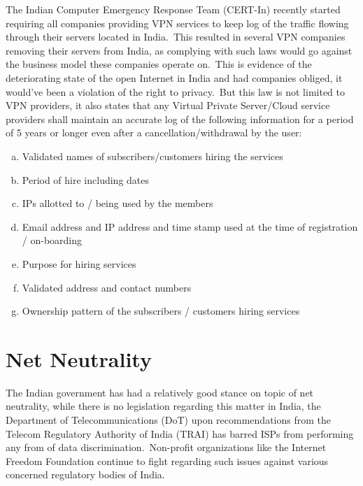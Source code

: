 \documentclass[11pt,a4paper,oneside]{scrarticle}
\begin{document}
    The Indian Computer Emergency Response Team (CERT-In) recently started requiring all companies providing VPN
    services to keep log of the traffic flowing through their servers located in India.\ This resulted in several VPN
    companies removing their servers from India, as complying with such laws would go against the business model these
    companies operate on.\ This is evidence of the deteriorating state of the open Internet in India and had companies
    obliged, it would've been a violation of the right to privacy.\ But this law is not limited to VPN providers, it
    also states that any Virtual Private Server/Cloud service providers shall maintain an accurate log of the following
    information for a period of 5 years or longer even after a cancellation/withdrawal by the user:

    \begin{enumerate}[(a)]
        \singlespacing
        \item Validated names of subscribers/customers hiring the services
        \item Period of hire including dates
        \item IPs allotted to / being used by the members
        \item Email address and IP address and time stamp used at the time of registration / on-boarding
        \item Purpose for hiring services
        \item Validated address and contact numbers
        \item Ownership pattern of the subscribers / customers hiring services
    \end{enumerate}




    \section{Net Neutrality}\label{sec:net-neutrality}

    The Indian government has had a relatively good stance on topic of net neutrality, while there is no legislation
    regarding this matter in India, the Department of Telecommunications (DoT) upon recommendations from the Telecom
    Regulatory Authority of India (TRAI) has barred ISPs from performing any from of data discrimination.\ Non-profit
    organizations like the Internet Freedom Foundation continue to fight regarding such issues against various concerned
    regulatory bodies of India.
\end{document}
